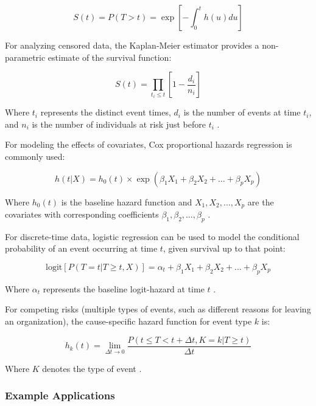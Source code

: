\documentclass[../main.tex]{subfiles}
\begin{document}
\[S(t) = P(T > t) = \exp\left[-\int_0^t h(u)du\right]\]

For analyzing censored data, the Kaplan-Meier estimator provides a non-parametric estimate of the survival function:

\[S(t) = \prod_{t_i \leq t} \left[1 - \frac{d_i}{n_i}\right]\]

Where \(t_i\) represents the distinct event times, \(d_i\) is the number of events at time \(t_i\), and \(n_i\) is the number of individuals at risk just before \(t_i\) \citep{code2020event}.

For modeling the effects of covariates, Cox proportional hazards regression is commonly used:

\[h(t|X) = h_0(t) \times \exp(\beta_1 X_1 + \beta_2 X_2 + \ldots + \beta_p X_p)\]

Where \(h_0(t)\) is the baseline hazard function and \(X_1, X_2, \ldots, X_p\) are the covariates with corresponding coefficients \(\beta_1, \beta_2, \ldots, \beta_p\) \citep{code2020event}.

For discrete-time data, logistic regression can be used to model the conditional probability of an event occurring at time \(t\), given survival up to that point:

\[\text{logit}[P(T = t | T \geq t, X)] = \alpha_t + \beta_1 X_1 + \beta_2 X_2 + \ldots + \beta_p X_p\]

Where \(\alpha_t\) represents the baseline logit-hazard at time \(t\) \citep{allison1982discrete}.

For competing risks (multiple types of events, such as different reasons for leaving an organization), the cause-specific hazard function for event type \(k\) is:

\[h_k(t) = \lim_{\Delta t \to 0} \frac{P(t \leq T < t+\Delta t, K = k | T \geq t)}{\Delta t}\]

Where \(K\) denotes the type of event \citep{code2020event}.

\subsubsection{Example Applications}
\end{document}
